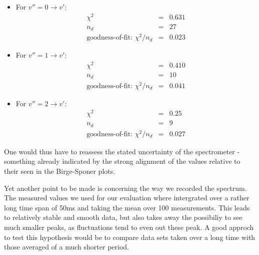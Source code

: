 \begin{itemize}
    \item For $v'' = 0 \rightarrow v'$:
        \begin{eqnarray}
            \chi^2 &=& 0.631 \\
            n_d &=& 27 \\
            \text{goodness-of-fit: } \chi^2 / n_d &=& 0.023
        \end{eqnarray}
    \item For $v'' = 1 \rightarrow v'$:
        \begin{eqnarray}
            \chi^2 &=& 0.410 \\
            n_d &=& 10 \\
            \text{goodness-of-fit: } \chi^2 / n_d &=& 0.041
        \end{eqnarray}
    \item For $v'' = 2 \rightarrow v'$:
        \begin{eqnarray}
            \chi^2 &=& 0.25 \\
            n_d &=& 9 \\
            \text{goodness-of-fit: } \chi^2 / n_d &=& 0.027
        \end{eqnarray}
\end{itemize}
One would thus have to reassess the stated uncertainty of the spectrometer - 
something already indicated by the strong alignment of the values relative 
to their seen in the Birge-Sponer plots.

Yet another point to be made is concerning the way we recorded the spectrum. 
The measured values we used for our evaluation where intergrated over a rather 
long time span of 50ms and taking the mean over 100 measurements. 
This leads to relatively stable and smooth data, but
also takes away the possibiliy to see much smaller peaks, as fluctuations tend 
to even out these peak. A good approch to test this hypothesis would be to 
compare data sets taken over a long time with those averaged of a much shorter 
period. 

